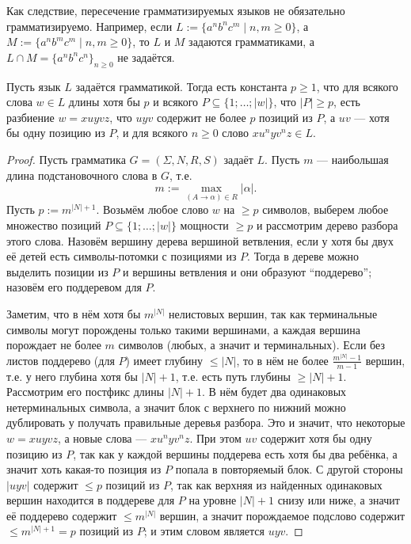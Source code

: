\documentclass[12pt,a4paper]{article}
\begin{document}
    \begin{remark}
        Как следствие, пересечение грамматизируемых языков не обязательно грамматизируемо. Например, если $L := \{a^n b^n c^m \mid n, m \geqslant 0\}$, а $M := \{a^n b^m c^m \mid n, m \geqslant 0\}$, то $L$ и $M$ задаются грамматиками, а $L \cap M = \{a^n b^n c^n\}_{n \geqslant 0}$ не задаётся.
    \end{remark}

    \begin{lemma}[Огдан, 1968]
        Пусть язык $L$ задаётся грамматикой. Тогда есть константа $p \geqslant 1$, что для всякого слова $w \in L$ длины хотя бы $p$ и всякого $P \subseteq \{1; \dots; |w|\}$, что $|P| \geqslant p$, есть разбиение $w = xuyvz$, что $uyv$ содержит не более $p$ позиций из $P$, а $uv$ --- хотя бы одну позицию из $P$, и для всякого $n \geqslant 0$ слово $x u^n y v^n z \in L$.
    \end{lemma}

    \begin{proof}
        Пусть грамматика $G = (\Sigma, N, R, S)$ задаёт $L$. Пусть $m$ --- наибольшая длина подстановочного слова в $G$, т.е.
        \[m := \max_{(A \to \alpha) \in R} |\alpha|.\]
        Пусть $p := m^{|N| + 1}$. Возьмём любое слово $w$ на $\geqslant p$ символов, выберем любое множество позиций $P \subseteq \{1; \dots; |w|\}$ мощности $\geqslant p$ и рассмотрим дерево разбора этого слова. Назовём вершину дерева вершиной ветвления, если у хотя бы двух её детей есть символы-потомки с позициями из $P$. Тогда в дереве можно выделить позиции из $P$ и вершины ветвления и они образуют ``поддерево''; назовём его поддеревом для $P$.
        
        Заметим, что в нём хотя бы $m^{|N|}$ нелистовых вершин, так как терминальные символы могут порождены только такими вершинами, а каждая вершина порождает не более $m$ символов (любых, а значит и терминальных). Если без листов поддерево (для $P$) имеет глубину $\leqslant |N|$, то в нём не более $\frac{m^{|N|} - 1}{m-1}$ вершин, т.е. у него глубина хотя бы $|N| + 1$, т.е. есть путь глубины $\geqslant |N| + 1$. Рассмотрим его постфикс длины $|N| + 1$. В нём будет два одинаковых нетерминальных символа, а значит блок с верхнего по нижний можно дублировать у получать правильные деревья разбора. Это и значит, что некоторые $w = xuyvz$, а новые слова --- $x u^n y v^n z$. При этом $uv$ содержит хотя бы одну позицию из $P$, так как у каждой вершины поддерева есть хотя бы два ребёнка, а значит хоть какая-то позиция из $P$ попала в повторяемый блок. С другой стороны $|uyv|$ содержит $\leqslant p$ позиций из $P$, так как верхняя из найденных одинаковых вершин находится в поддереве для $P$ на уровне $|N| + 1$ снизу или ниже, а значит её поддерево содержит $\leqslant m^{|N|}$ вершин, а значит порождаемое подслово содержит $\leqslant m^{|N| + 1} = p$ позиций из $P$; и этим словом является $uyv$.
    \end{proof}
\end{document}
